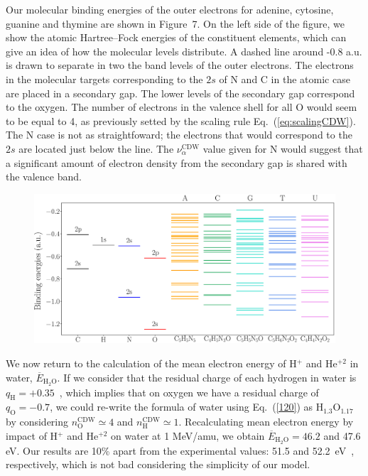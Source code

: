 \documentclass[preprint,12pt]{article}
\begin{document}
Our molecular binding energies of the outer electrons for adenine, 
cytosine, guanine and thymine are shown in Figure~7. On the left side 
of the figure, we show the atomic Hartree--Fock energies of the 
constituent elements, which can give an idea of how the molecular levels 
distribute. A dashed line around -0.8 a.u. is drawn to separate in two 
the band levels of the outer electrons. The electrons in the molecular 
targets corresponding to the $2s$ of N and C in the atomic case are 
placed in a secondary gap. The lower levels of the secondary gap 
correspond to the oxygen. The number of electrons in the valence 
shell for all O would seem to be equal to 4, as previously setted by the 
scaling rule Eq.~(\ref{eq:scalingCDW}). The N case is not as 
straightfoward; the electrons that would correspond to the $2s$ are 
located just below the line. The $\nu_{\alpha }^{\text{CDW}}$ value 
given for N would suggest that a significant amount of electron density 
from the secondary gap is shared with the valence band.

\begin{figure}[H]
\centering
\includegraphics[width=\textwidth]{figuras/levelsDNA.eps}
\end{figure}


We now return to the calculation of the mean electron energy of H$^{+}$ 
and He$^{+2}$ in water, $\overline{E}_{\text{H}_2\text{O}}$. If we 
consider that the residual charge of each hydrogen in water is 
$q_{\text{H}}=+0.35$~\cite{rappe1991}, which implies that on oxygen we 
have a residual charge of $q_{\text{O}}=-0.7$, we could re-write the 
formula of water using Eq.~(\ref{120}) as H$_{1.3}$O$_{1.17}$ by 
considering 
$n_{\text{O}}^{\text{CDW}}\simeq 4$ and 
$n_{\text{H}}^{\text{CDW}}\simeq 1$. Recalculating mean electron energy 
by impact of H$^{+}$ and He$^{+2}$ on water at 1 MeV/amu, we obtain
$\overline{E}_{\text{H}_2\text{O}}=46.2$ and 47.6 eV. Our results 
are 10\% apart from the experimental values: 51.5 and 
52.2~eV~\cite{pimblott2007}, respectively, which is not bad considering 
the simplicity of our model.
\end{document}
